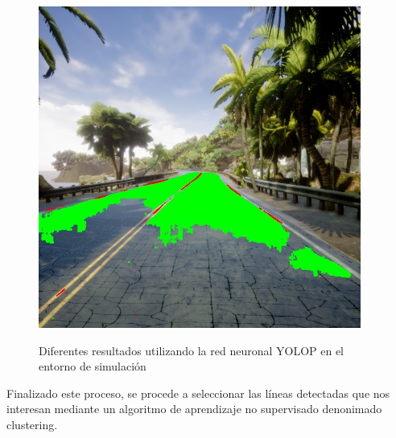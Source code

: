 \begin{figure}[H]
\begin{center}
{      \includegraphics[scale=0.4]{figs/Plataformas_Desarollo/resultados-yolop/sitio1/ONNX-1280-1280.jpg}
      \label{f:yolop-1280-1280.onnx}}
  \caption{Diferentes resultados utilizando la red neuronal YOLOP en el entorno de simulación}
  \label{f:resultadosYOLOP}
  \end{center}
 \end{figure}

Finalizado este proceso, se procede a seleccionar las líneas detectadas que nos interesan mediante un algoritmo de aprendizaje no supervisado denonimado clustering.

